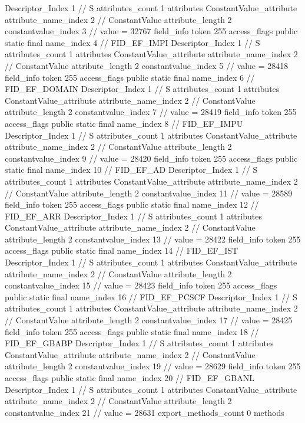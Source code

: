 {{{{{				Descriptor_Index	1		// S
				attributes_count	1
				attributes {
				ConstantValue_attribute {
					attribute_name_index	2		// ConstantValue
					attribute_length	2
					constantvalue_index	3		// value = 32767
				}
				}
			}
			field_info {
				token	255
				access_flags	public static final
				name_index	4		// FID_EF_IMPI
				Descriptor_Index	1		// S
				attributes_count	1
				attributes {
				ConstantValue_attribute {
					attribute_name_index	2		// ConstantValue
					attribute_length	2
					constantvalue_index	5		// value = 28418
				}
				}
			}
			field_info {
				token	255
				access_flags	public static final
				name_index	6		// FID_EF_DOMAIN
				Descriptor_Index	1		// S
				attributes_count	1
				attributes {
				ConstantValue_attribute {
					attribute_name_index	2		// ConstantValue
					attribute_length	2
					constantvalue_index	7		// value = 28419
				}
				}
			}
			field_info {
				token	255
				access_flags	public static final
				name_index	8		// FID_EF_IMPU
				Descriptor_Index	1		// S
				attributes_count	1
				attributes {
				ConstantValue_attribute {
					attribute_name_index	2		// ConstantValue
					attribute_length	2
					constantvalue_index	9		// value = 28420
				}
				}
			}
			field_info {
				token	255
				access_flags	public static final
				name_index	10		// FID_EF_AD
				Descriptor_Index	1		// S
				attributes_count	1
				attributes {
				ConstantValue_attribute {
					attribute_name_index	2		// ConstantValue
					attribute_length	2
					constantvalue_index	11		// value = 28589
				}
				}
			}
			field_info {
				token	255
				access_flags	public static final
				name_index	12		// FID_EF_ARR
				Descriptor_Index	1		// S
				attributes_count	1
				attributes {
				ConstantValue_attribute {
					attribute_name_index	2		// ConstantValue
					attribute_length	2
					constantvalue_index	13		// value = 28422
				}
				}
			}
			field_info {
				token	255
				access_flags	public static final
				name_index	14		// FID_EF_IST
				Descriptor_Index	1		// S
				attributes_count	1
				attributes {
				ConstantValue_attribute {
					attribute_name_index	2		// ConstantValue
					attribute_length	2
					constantvalue_index	15		// value = 28423
				}
				}
			}
			field_info {
				token	255
				access_flags	public static final
				name_index	16		// FID_EF_PCSCF
				Descriptor_Index	1		// S
				attributes_count	1
				attributes {
				ConstantValue_attribute {
					attribute_name_index	2		// ConstantValue
					attribute_length	2
					constantvalue_index	17		// value = 28425
				}
				}
			}
			field_info {
				token	255
				access_flags	public static final
				name_index	18		// FID_EF_GBABP
				Descriptor_Index	1		// S
				attributes_count	1
				attributes {
				ConstantValue_attribute {
					attribute_name_index	2		// ConstantValue
					attribute_length	2
					constantvalue_index	19		// value = 28629
				}
				}
			}
			field_info {
				token	255
				access_flags	public static final
				name_index	20		// FID_EF_GBANL
				Descriptor_Index	1		// S
				attributes_count	1
				attributes {
				ConstantValue_attribute {
					attribute_name_index	2		// ConstantValue
					attribute_length	2
					constantvalue_index	21		// value = 28631
				}
				}
			}
			}
			export_methods_count	0
			methods {
			}
		}
	}
}

